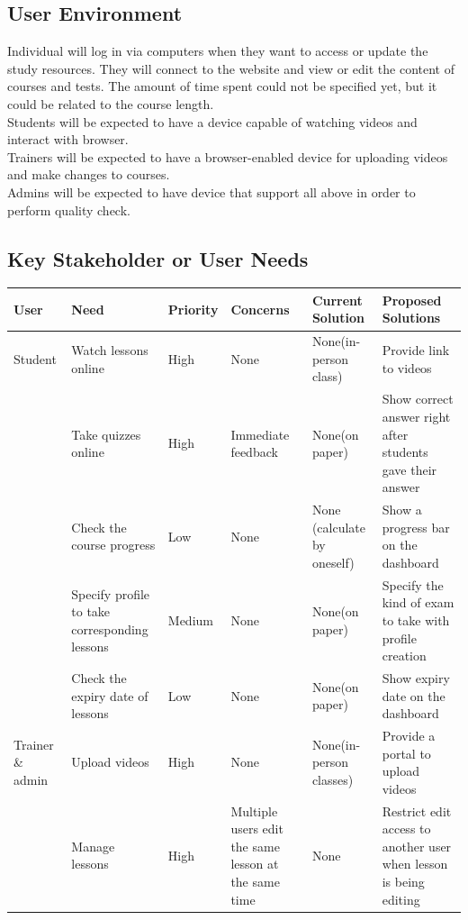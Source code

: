 \documentclass[a4paper]{article}
\begin{document}
\bigskip
\subsection{User Environment}
Individual will log in via computers when they want to access or update the study resources. They will connect to the website and view or edit the content of courses and tests. The amount of time spent could not be specified yet, but it could be related to the course length. \\
Students will be expected to have a device capable of watching videos and interact with browser.\\
Trainers will be expected to have a browser-enabled device for uploading videos and make changes to courses. \\
Admins will be expected to have device that support all above in order to perform quality check.


\bigskip
\pagebreak
\subsection{Key Stakeholder or User Needs}
\begin{table}[!htb]
\begin{tabular}{|p{1.5cm}|p{3cm}|l|p{2cm}|p{2cm}|p{3.8cm}|}
\hline
\rowcolor{gray}
User & Need & Priority & Concerns & Current Solution & Proposed Solutions \\ \hline
Student & Watch lessons online & High & None & None(in-person class) & Provide link to videos \\ \hline
 & Take quizzes online & High & Immediate feedback & None(on paper) & Show correct answer right after students gave their answer\\ \hline
 & Check the course progress & Low & None & None (calculate by oneself) & Show a progress bar on the dashboard\\ \hline
 & Specify profile to take corresponding lessons & Medium & None & None(on paper) & Specify the kind of exam to take with profile creation \\ \hline
 & Check the expiry date of lessons & Low & None & None(on paper) & Show expiry date on the dashboard \\ \hline
Trainer \& admin & Upload videos & High & None & None(in-person classes) & Provide a portal to upload videos\\ \hline
 & Manage lessons & High & Multiple users edit the same lesson at the same time & None & Restrict edit access to another user when lesson is being editing\\
\hline
\end{tabular}
\end{table}
\end{document}

